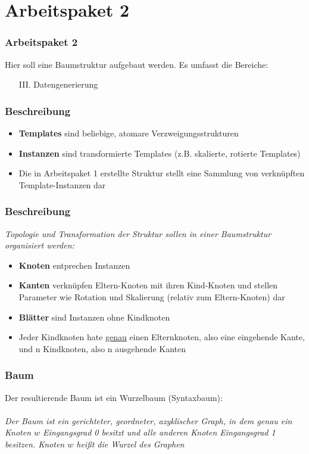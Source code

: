 \documentclass[12pt]{beamer}
\begin{document}
    \section{Arbeitspaket 2}
    \label{sec:2}

    \begin{frame}
        \frametitle{Arbeitspaket 2}
        Hier soll eine Baumstruktur aufgebaut werden.
        Es umfasst die Bereiche:
        \begin{itemize}
            \item[III.] Datengenerierung
        \end{itemize}
    \end{frame}

    \begin{frame}
        \frametitle{Beschreibung}
        \begin{itemize}
            \item \textbf{Templates} sind beliebige, atomare Verzweigungsstrukturen
            \item \textbf{Instanzen} sind transformierte Templates (z.B. skalierte, rotierte Templates)
            \item Die in Arbeitspaket 1 erstellte Struktur stellt eine Sammlung von verknüpften Template-Instanzen dar
        \end{itemize}
    \end{frame}

    \begin{frame}
        \frametitle{Beschreibung}
        \textit{Topologie und Transformation der Struktur sollen in einer  Baumstruktur organisiert werden:}
        \begin{itemize}
            \item \textbf{Knoten} entprechen Instanzen
            \item \textbf{Kanten} verknüpfen Eltern-Knoten mit ihren Kind-Knoten und stellen Parameter wie Rotation
            und Skalierung (relativ zum Eltern-Knoten) dar
            \item \textbf{Blätter} sind Instanzen ohne Kindknoten
            \item Jeder Kindknoten hate \underline{genau} einen Elternknoten, also eine eingehende Kante, und n
            Kindknoten, also n ausgehende Kanten
        \end{itemize}
    \end{frame}

    \begin{frame}
        \frametitle{Baum}
        Der resultierende Baum ist ein Wurzelbaum (Syntaxbaum):\\~\\
        \textit{Der Baum ist ein gerichteter, geordneter, azyklischer Graph, in dem genau ein Knoten $w$ Eingangsgrad 0
        besitzt und alle anderen Knoten Eingangsgrad 1 besitzen. Knoten $w$ heißt die Wurzel des Graphen}
    \end{frame}
\end{document}
